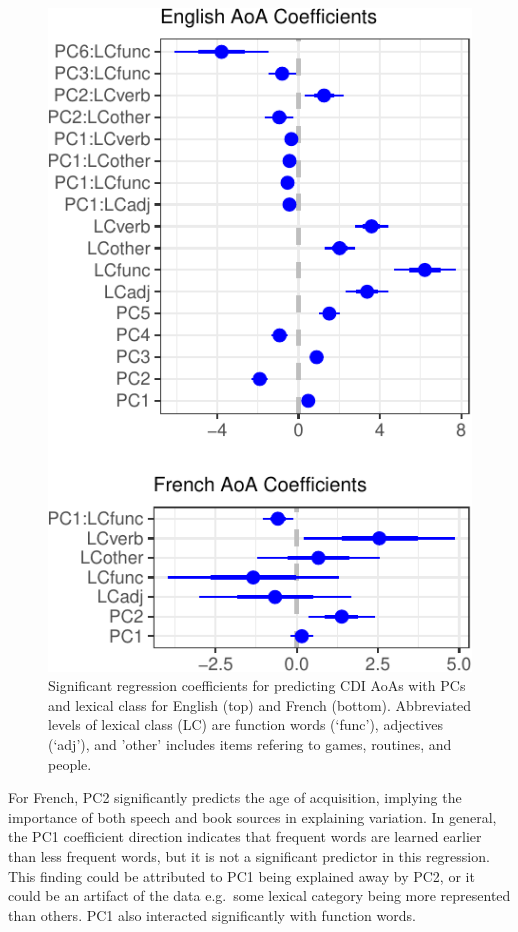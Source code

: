 \documentclass[10pt, letterpaper]{article}
\newenvironment{CodeChunk}{}{}
\begin{document}
\begin{CodeChunk}
\begin{figure}[H]

{\centering \includegraphics{figs/unnamed-chunk-9-1} 

}

\caption[Significant regression coefficients for predicting CDI AoAs with PCs and lexical class for English (top) and French (bottom)]{Significant regression coefficients for predicting CDI AoAs with PCs and lexical class for English (top) and French (bottom). Abbreviated levels of lexical class (LC) are function words (`func'), adjectives (`adj'), and 'other' includes items refering to games, routines, and people.}\label{fig:unnamed-chunk-9}
\end{figure}
\end{CodeChunk}

For French, PC2 significantly predicts the age of acquisition, implying
the importance of both speech and book sources in explaining variation.
In general, the PC1 coefficient direction indicates that frequent words
are learned earlier than less frequent words, but it is not a
significant predictor in this regression. This finding could be
attributed to PC1 being explained away by PC2, or it could be an
artifact of the data e.g.~some lexical category being more represented
than others. PC1 also interacted significantly with function words.
\end{document}
